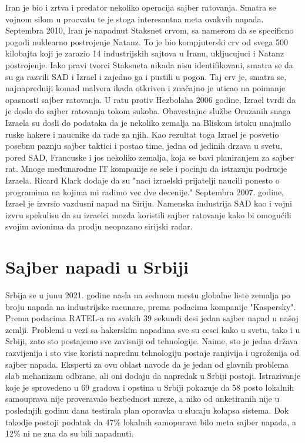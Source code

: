 \documentclass[a4paper]{article}
\begin{document}
{Iran je bio i zrtva i predator nekoliko operacija sajber ratovanja. Smatra se vojnom silom u procvatu te je stoga interesantna meta ovakvih napada.
Septembra 2010, Iran je napadnut Staksnet crvom, sa namerom da se specificno pogodi nuklearno postrojenje Natanz. To je bio kompjuterski crv od svega 500 kilobajta koji je zarazio 14 industrijskih sajtova u Iranu, ukljucujuci i Natanz postrojenje. Iako pravi tvorci Staksneta nikada nisu identifikovani, smatra se da su ga razvili SAD i Izrael i zajedno ga i pustili u pogon. Taj crv je, smatra se, najnapredniji komad malvera ikada otkriven i značajno je uticao na poimanje opasnosti sajber ratovanja.
U ratu protiv Hezbolaha 2006 godine, Izrael tvrdi da je doslo do sajber ratovanja tokom sukoba. Obavestajne službe Oruzanih snaga Izraela su dosli do podataka da je nekoliko zemalja na Bliskom istoku unajmilo ruske hakere i naucnike da rade za njih. Kao rezultat toga Izrael je posvetio posebnu paznju sajber taktici i postao time, jedna od jedinih drzava u svetu, pored SAD, Francuske i jos nekoliko zemalja, koja se bavi planiranjem za sajber rat. Mnoge međunarodne IT kompanije se sele i pocinju da istrazuju podrucje Izraela. Ricard Klark dodaje da su "naci izraelski prijatelji naucili ponesto o programima na kojima mi radimo vec dve decenije."
Septembra 2007. godine, Izrael je izvrsio vazdusni napad na Siriju. Namenska industrija SAD kao i vojni izvru spekulisu da su izraelci mozda koristili sajber ratovanje kako bi omogućili svojim avionima da prodju neopazano sirijski radar.
\section{Sajber napadi u Srbiji}

Srbija se u junu 2021. godine nasla na sedmom mestu globalne liste zemalja po broju napada na industrijske racunare, prema podacima kompanije "Kaspersky". Prema podacima RATEL-a na svakih 39 sekundi desi jedan sajber napad u našoj zemlji.
Problemi u vezi sa hakerskim napadima sve su cesci kako u svetu, tako i u Srbiji, zato sto postajemo sve zavisniji od tehnologije. Naime, sto je jedna država razvijenija i sto vise koristi naprednu tehnologiju postaje ranjivija i ugroženija od sajber napada.
Eksperti za ovu oblast navode da je jedan od glavnih problema slab mehanizam odbrane, ali  oni dodaju da napredak u Srbiji postoji. 
Istrazivanje koje je sprovedeno u 69 gradova i opstina u Srbiji pokazuje da 58 posto lokalnih samouprava nije proveravalo bezbednost mreze, a niko od anketiranih nije u poslednjih godinu dana testirala plan oporavka u slucaju kolapsa sistema. Dok takodje postoji podatak da 47\% lokalnih samopurava bilo meta sajber napada, a 12\% ni ne zna da su bili napadnuti.  

}
\end{document}
